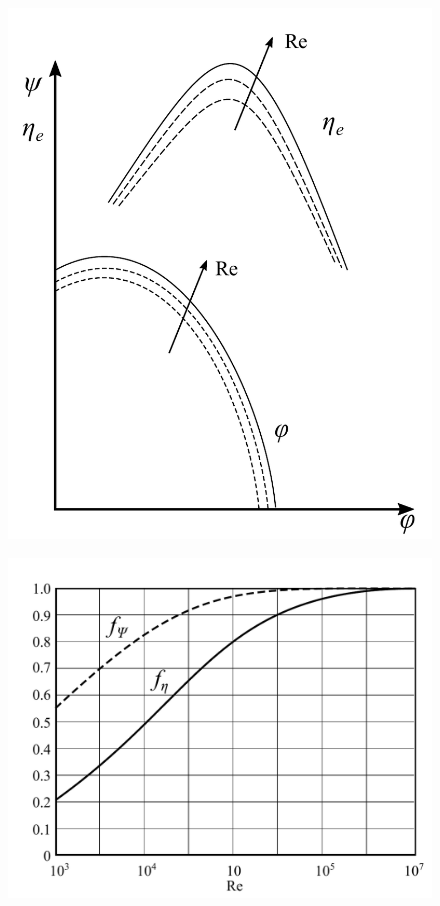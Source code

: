 \begin{figure}
\centering
\begin{minipage}{.4\textwidth}
  \centering
  \includegraphics[width=.95\linewidth]{fig/secondo_1.pdf}
  \label{fig:secondo_1}
\end{minipage}%
\begin{minipage}{.6\textwidth}
  \centering
  \includegraphics[width=.95\linewidth]{fig/secondo_2.pdf}
  \label{fig:secondo_2}
\end{minipage}
\end{figure}
